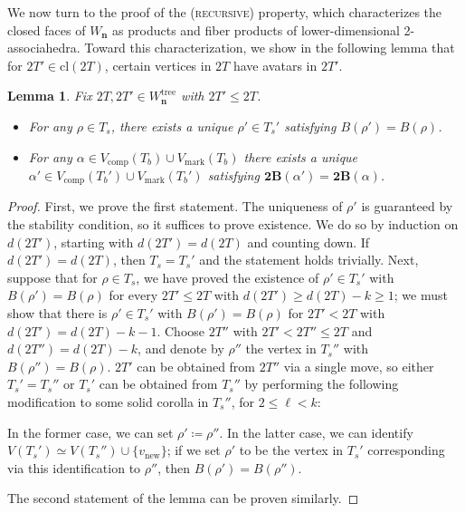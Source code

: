 \documentclass[11pt]{amsart}
\newtheorem{lemma}[theorem]{Lemma}
\theoremstyle{definition}
\theoremstyle{remark}
\theoremstyle{plain}
\newcommand\bn{\mathbf{n}}
\newcommand{\btB}{{\mathbf{2B}}}
\newcommand{\on}{\operatorname}
\newcommand{\comp}{C^2}
\renewcommand{\comp}{{\on{comp}}}
\newcommand{\mk}{{\on{mark}}}
\newcommand{\tree}{{\on{tree}}}
\newcommand{\cl}{\mathrm{cl}}
\begin{document}

We now turn to the proof of the \textsc{(recursive)} property, which characterizes the closed faces of $W_\bn$ as products and fiber products of lower-dimensional 2-associahedra.
Toward this characterization, we show in the following lemma that for $2T' \in \cl(2T)$, certain vertices in $2T$ have avatars in $2T'$.

\begin{lemma}
\label{lem:avatars}
Fix $2T, 2T' \in W_\bn^\tree$ with $2T' \leq 2T$.
\begin{itemize}
\item For any $\rho \in T_s$, there exists a unique $\rho' \in T_s'$ satisfying $B(\rho') = B(\rho)$.

\item For any $\alpha \in V_\comp(T_b) \cup V_\mk(T_b)$ there exists a unique $\alpha' \in V_\comp(T_b') \cup V_\mk(T_b')$ satisfying $\btB(\alpha') = \btB(\alpha)$.
\end{itemize}
\end{lemma}

\begin{proof}
First, we prove the first statement.
The uniqueness of $\rho'$ is guaranteed by the stability condition, so it suffices to prove existence.
We do so by induction on $d(2T')$, starting with $d(2T') = d(2T)$ and counting down.
If $d(2T')=d(2T)$, then $T_s=T_s'$ and the statement holds trivially.
Next, suppose that for $\rho \in T_s$, we have proved the existence of $\rho' \in T_s'$ with $B(\rho') = B(\rho)$ for every $2T' \leq 2T$ with $d(2T')\geq d(2T)-k \geq 1$; we must show that there is $\rho' \in T_s'$ with $B(\rho') = B(\rho)$ for $2T' < 2T$ with $d(2T') = d(2T)-k-1$.
Choose $2T''$ with $2T' < 2T'' \leq 2T$ and $d(2T'') = d(2T)-k$, and denote by $\rho''$ the vertex in $T_s''$ with $B(\rho'')=B(\rho)$.
$2T'$ can be obtained from $2T''$ via a single move, so either $T_s' = T_s''$ or $T_s'$ can be obtained from $T_s''$ by performing the following modification to some solid corolla in $T_s''$, for $2\leq\ell<k$:

\begin{figure}[H]
\centering
\def\svgwidth{0.35\columnwidth}

\end{figure}

\noindent In the former case, we can set $\rho'\coloneqq \rho''$.
In the latter case, we can identify $V(T_s') \simeq V(T_s'') \cup \{v_{\text{new}}\}$; if we set $\rho'$ to be the vertex in $T_s'$ corresponding via this identification to $\rho''$, then $B(\rho') = B(\rho'')$.

The second statement of the lemma can be proven similarly.
\end{proof}
\end{document}
